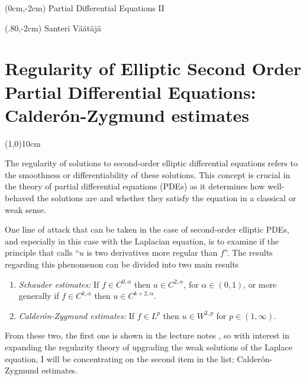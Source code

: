 \documentclass[12pt]{artikel1}
\begin{document}
\begin{textblock*}{250mm}(0cm,-2cm)
\noindent Partial Differential Equations \RN{2}
\end{textblock*}
\begin{textblock*}{250mm}(.80\textwidth,-2cm)
\noindent Santeri Väätäjä
\end{textblock*}
\vspace*{-2cm}
\section*{Regularity of Elliptic Second Order Partial Differential Equations: Calder\'{o}n-Zygmund estimates}
\vspace*{-.5cm}
\line(1,0){10cm}
\vspace*{.5cm}

\noindent The regularity of solutions to second-order elliptic differential equations refers to the smoothness or differentiability of these solutions. This concept is crucial in the theory of partial differential equations (PDEs) as it determines how well-behaved the solutions are and whether they satisfy the equation in a classical or weak sense.

One line of attack that can be taken in the case of second-order elliptic PDEs, and especially in this case with the Laplacian equation, is to examine if the principle that \cite{Fern_ndez_Real_2022} calls ``$u$ is two derivatives more regular than $f$''. The results regarding this phenomenon can be divided into two main results

\begin{enumerate}
    \item \textit{Schauder estimates:} If $f\in C^{0,\alpha}$ then $u\in C^{2,\alpha}$, for $\alpha\in(0,1)$, or more generally if $f\in C^{k,\alpha}$ then $u\in C^{k+2,\alpha}$.
    \item \textit{Calder\'{o}n-Zygmund estimates:} If $f\in L^p$ then $u\in W^{2,p}$ for $p\in(1,\infty)$.
\end{enumerate}

\noindent From these two, the first one is shown in the lecture notes \cite{covi}, so with interest in expanding the regularity theory of upgrading the weak solutions of the Laplace equation, I will be concentrating on the second item in the list; Calder\'{o}n-Zygmund estimates.
\end{document}
